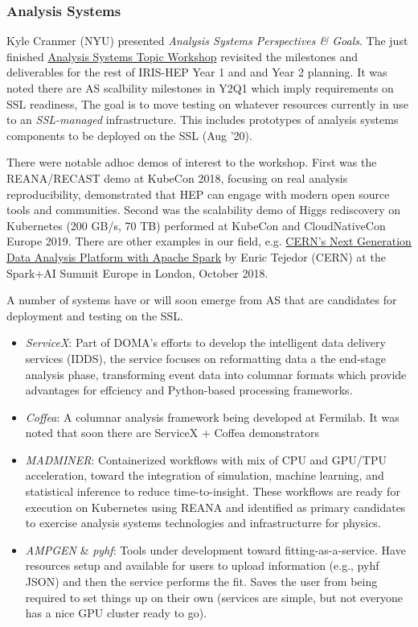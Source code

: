 \documentclass[11pt,letterpaper,fleqn]{article}
\begin{document}
\subsubsection{Analysis Systems}
Kyle Cranmer (NYU) presented {\it Analysis Systems Perspectives \& Goals}.  The just finished \href{https://indico.cern.ch/event/822074/}{Analysis Systems Topic Workshop} revisited the milestones and deliverables for the rest of IRIS-HEP Year 1 and and Year 2 planning.  It was noted there are AS scalbility milestones in Y2Q1 which imply requirements on SSL readiness,  The goal is to move testing on whatever resources currently in use to an {\it SSL-managed} infrastructure.
This includes prototypes of analysis systems components to be deployed on the SSL (Aug '20).

There were notable adhoc demos of interest to the workshop. First was the REANA/RECAST demo at KubeCon 2018, focusing on real analysis reproducibility, demonstrated that HEP can engage with modern open source tools and communities.  Second was the scalability demo of Higgs rediscovery on Kubernetes (200 GB/s, 70 TB) performed at KubeCon and CloudNativeCon Europe 2019.  There are other examples in our field, e.g. \href{https://www.youtube.com/watch?v=Ye8MlJQumaI}{CERN’s Next Generation Data Analysis Platform with Apache Spark} by Enric Tejedor (CERN) at the Spark+AI Summit Europe in London, October 2018.

A number of systems have or will soon emerge from AS that are candidates for deployment and testing on the SSL.

\begin{itemize}
  \item {\it ServiceX}: Part of DOMA's efforts to develop the intelligent data delivery services (IDDS), the service focuses on reformatting data a the end-stage analysis phase, transforming event data into columnar formats which provide advantages for effciency and Python-based processing frameworks.
  \item {\it Coffea}: A columnar analysis framework being developed at Fermilab. It was noted that soon there are ServiceX + Coffea demonstrators
  \item {\it MADMINER}: Containerized workflows with mix of CPU and GPU/TPU acceleration, toward the integration of simulation, machine learning, and statistical inference to reduce time-to-insight. These workflows are ready for execution on Kubernetes using REANA and identified as primary candidates to exercise analysis systems technologies and infrastructurre for physics.
  \item {\it AMPGEN} \& {\it pyhf}: Tools under development toward fitting-as-a-service. Have resources setup and available for users to upload information (e.g., pyhf JSON) and then the service performs the fit. Saves the user from being required to set things up on their own (services are simple, but not everyone has a nice GPU cluster ready to go).
\end{itemize}
\end{document}

